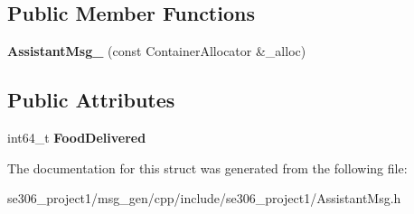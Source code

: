 \subsection*{Public Member Functions}
\begin{DoxyCompactItemize}
\item 
\hypertarget{structse306__project1_1_1AssistantMsg___af325d6761ff1fe9faf15d9191ecf30a9}{{\bfseries Assistant\-Msg\-\_\-} (const Container\-Allocator \&\-\_\-alloc)}\label{structse306__project1_1_1AssistantMsg___af325d6761ff1fe9faf15d9191ecf30a9}

\end{DoxyCompactItemize}
\subsection*{Public Attributes}
\begin{DoxyCompactItemize}
\item 
\hypertarget{structse306__project1_1_1AssistantMsg___a4c1817b510e2f16f9f6e6625b9fd7e86}{int64\-\_\-t {\bfseries Food\-Delivered}}\label{structse306__project1_1_1AssistantMsg___a4c1817b510e2f16f9f6e6625b9fd7e86}

\end{DoxyCompactItemize}


The documentation for this struct was generated from the following file\-:\begin{DoxyCompactItemize}
\item 
se306\-\_\-project1/msg\-\_\-gen/cpp/include/se306\-\_\-project1/Assistant\-Msg.\-h\end{DoxyCompactItemize}
